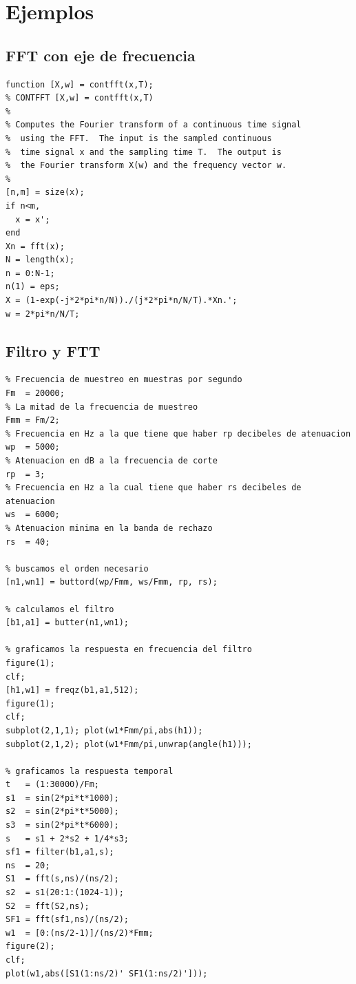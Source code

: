 \chapter{Ejemplos}

\section{FFT con eje de frecuencia}

\begin{verbatim}
function [X,w] = contfft(x,T);
% CONTFFT [X,w] = contfft(x,T)
%  
% Computes the Fourier transform of a continuous time signal
%  using the FFT.  The input is the sampled continuous
%  time signal x and the sampling time T.  The output is
%  the Fourier transform X(w) and the frequency vector w.
%
[n,m] = size(x);
if n<m,
  x = x';
end
Xn = fft(x);
N = length(x);
n = 0:N-1;
n(1) = eps;
X = (1-exp(-j*2*pi*n/N))./(j*2*pi*n/N/T).*Xn.';
w = 2*pi*n/N/T;
\end{verbatim}

\section{Filtro y FTT}
\begin{verbatim}
% Frecuencia de muestreo en muestras por segundo
Fm  = 20000;  
% La mitad de la frecuencia de muestreo
Fmm = Fm/2;
% Frecuencia en Hz a la que tiene que haber rp decibeles de atenuacion   
wp  = 5000;
% Atenuacion en dB a la frecuencia de corte   
rp  = 3;
% Frecuencia en Hz a la cual tiene que haber rs decibeles de atenuacion      
ws  = 6000; 
% Atenuacion minima en la banda de rechazo  
rs  = 40;     

% buscamos el orden necesario
[n1,wn1] = buttord(wp/Fmm, ws/Fmm, rp, rs);

% calculamos el filtro
[b1,a1] = butter(n1,wn1);

% graficamos la respuesta en frecuencia del filtro
figure(1); 
clf; 
[h1,w1] = freqz(b1,a1,512);
figure(1);  
clf;
subplot(2,1,1); plot(w1*Fmm/pi,abs(h1));
subplot(2,1,2); plot(w1*Fmm/pi,unwrap(angle(h1)));

% graficamos la respuesta temporal
t   = (1:30000)/Fm;
s1  = sin(2*pi*t*1000);
s2  = sin(2*pi*t*5000);
s3  = sin(2*pi*t*6000);
s   = s1 + 2*s2 + 1/4*s3;
sf1 = filter(b1,a1,s);
ns  = 20;
S1  = fft(s,ns)/(ns/2);
s2  = s1(20:1:(1024-1));
S2  = fft(S2,ns);
SF1 = fft(sf1,ns)/(ns/2);
w1  = [0:(ns/2-1)]/(ns/2)*Fmm;
figure(2); 
clf;
plot(w1,abs([S1(1:ns/2)' SF1(1:ns/2)']));

\end{verbatim}


